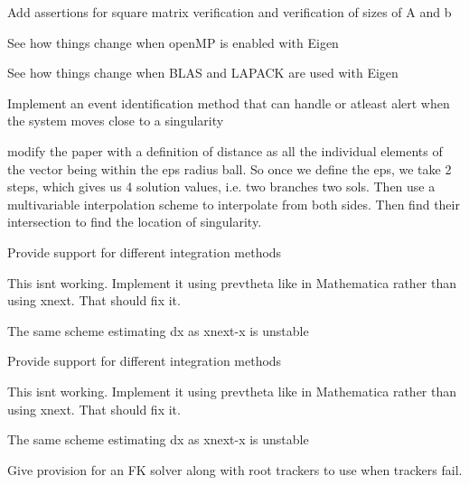 
\begin{DoxyRefList}
\item[Member \mbox{\hyperlink{utils_8hh_a7ed506e6d7b8ba153e1b8b24a7b6e5c4}{linear\+Solve}} (Matrix\+Xd Amat, Vector\+Xd bvec)]\label{todo__todo000013}%
%
Add assertions for square matrix verification and verification of sizes of A and b  
\item[Class \mbox{\hyperlink{classRootTracker}{Root\+Tracker}} ]\label{todo__todo000006}%
%
See how things change when open\+MP is enabled with Eigen 

See how things change when BLAS and LAPACK are used with Eigen 

Implement an event identification method that can handle or atleast alert when the system moves close to a singularity

\label{todo__todo000007}%
%
modify the paper with a definition of distance as all the individual elements of the vector being within the eps radius ball. So once we define the eps, we take 2 steps, which gives us 4 solution values, i.\+e. two branches two sols. Then use a multivariable interpolation scheme to interpolate from both sides. Then find their intersection to find the location of singularity.  
\item[Member \mbox{\hyperlink{classRootTracker_acc5d4b8e89ace70cee9c227f033e5a92}{Root\+Tracker\+::DMTracker}} (Vector\+Xd xprev, Vector\+Xd x, Vector\+Xd y, std\+::function$<$ Matrix\+Xd(\+Vector\+Xd)$>$ Jfx, std\+::function$<$ Matrix\+Xd(\+Vector\+Xd)$>$ Jfy, double eps=0, std\+::function$<$ Vector\+Xd(\+Vector\+Xd)$>$ f=NULL)]\label{todo__todo000003}%
%
Provide support for different integration methods 

This isnt working. Implement it using prevtheta like in Mathematica rather than using xnext. That should fix it. 

The same scheme estimating dx as xnext-\/x is unstable 

\label{todo__todo000010}%
%
Provide support for different integration methods 

This isnt working. Implement it using prevtheta like in Mathematica rather than using xnext. That should fix it. 

The same scheme estimating dx as xnext-\/x is unstable  
\item[Member \mbox{\hyperlink{classRootTracker_a0d29be3a24392b6a864b8e471f23db6c}{Root\+Tracker\+::Methods}} ()]\label{todo__todo000001}%
%
Give provision for an FK solver along with root trackers to use when trackers fail. 


\end{DoxyRefList}
